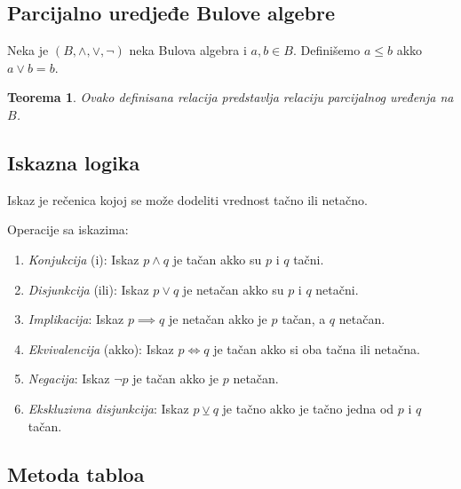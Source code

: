 \documentclass[12p,14paper]{article}
\newtheorem*{theorem}{Teorema}
\begin{document}
\begin{multicols}{2}
\subsection{Parcijalno uredjeđe Bulove algebre}

    Neka je $(B, \land, \lor, \neg)$ neka Bulova algebra i $a,b \in B$. 
    Definišemo $a \leq b$ akko $a \lor b = b$.

    \begin{theorem}
        Ovako definisana relacija predstavlja relaciju parcijalnog uređenja
        na $B$.
    \end{theorem}

\subsection{Iskazna logika}

    Iskaz je rečenica kojoj se može dodeliti vrednost tačno ili netačno.

    Operacije sa iskazima:
    \begin{enumerate}
        \itemsep0em
        \item \textit{Konjukcija} (i): Iskaz $p \land q$ je tačan akko su 
            $p$ i $q$ tačni.
        \item \textit{Disjunkcija} (ili): Iskaz $p \lor q$ je netačan akko
            su $p$ i $q$ netačni.
        \item \textit{Implikacija}: Iskaz $p \implies q$ je netačan akko
            je $p$ tačan, a $q$ netačan.
        \item \textit{Ekvivalencija} (akko): Iskaz $p \iff q$ je tačan akko 
            si oba tačna ili netačna.
        \item \textit{Negacija}: Iskaz $\neg p$ je tačan akko je $p$ netačan.
        \item \textit{Ekskluzivna disjunkcija}: Iskaz $p \veebar q$ je tačno
            akko je tačno jedna od $p$ i $q$ tačan.
    \end{enumerate}

\subsection{Metoda tabloa}

\end{multicols}
\end{document}
